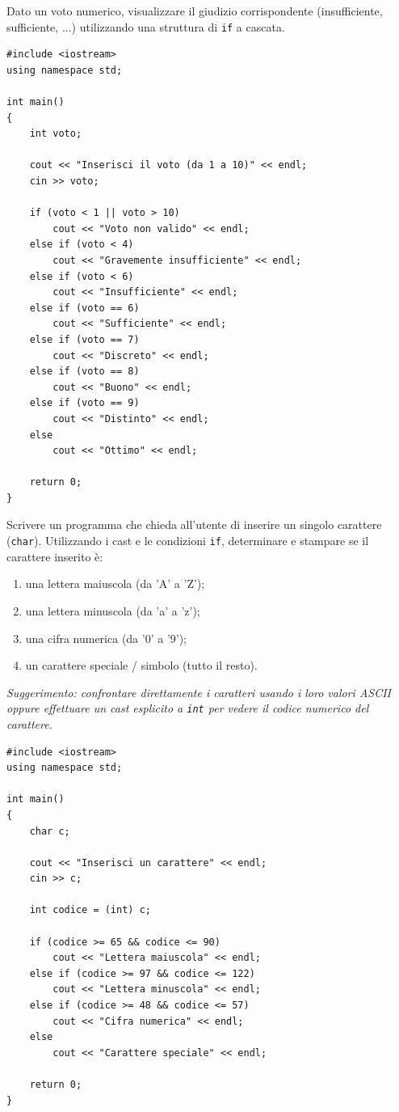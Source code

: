 \documentclass[11pt,fleqn]{book}
\begin{document}
\begin{esercizio}[1]
    Dato un voto numerico, visualizzare il giudizio corrispondente (insufficiente, sufficiente, ...) utilizzando una struttura di \texttt{if} a cascata.
    \ifsoluzioni
    \solution
    \begin{lstlisting}[style=cpp]
#include <iostream>
using namespace std;

int main()
{
    int voto;

    cout << "Inserisci il voto (da 1 a 10)" << endl;
    cin >> voto;

    if (voto < 1 || voto > 10)
        cout << "Voto non valido" << endl;
    else if (voto < 4)
        cout << "Gravemente insufficiente" << endl;
    else if (voto < 6)
        cout << "Insufficiente" << endl;
    else if (voto == 6)
        cout << "Sufficiente" << endl;
    else if (voto == 7)
        cout << "Discreto" << endl;
    else if (voto == 8)
        cout << "Buono" << endl;
    else if (voto == 9)
        cout << "Distinto" << endl;
    else
        cout << "Ottimo" << endl;

    return 0;
}
    \end{lstlisting}
    \fi
\end{esercizio}

\begin{esercizio}[2]
    Scrivere un programma che chieda all'utente di inserire un singolo carattere (\texttt{char}). Utilizzando i cast e le condizioni \texttt{if}, determinare e stampare se il carattere inserito è:
    \begin{enumerate}
        \item una lettera maiuscola (da 'A' a 'Z');
        \item una lettera minuscola (da 'a' a 'z');
        \item una cifra numerica (da '0' a '9');
        \item un carattere speciale / simbolo (tutto il resto).
    \end{enumerate}
    \textit{Suggerimento: confrontare direttamente i caratteri usando i loro valori ASCII oppure effettuare un cast esplicito a \texttt{int} per vedere il codice numerico del carattere.}
    \ifsoluzioni
    \solution
    \begin{lstlisting}[style=cpp]
#include <iostream>
using namespace std;

int main()
{
    char c;

    cout << "Inserisci un carattere" << endl;
    cin >> c;

    int codice = (int) c;

    if (codice >= 65 && codice <= 90)
        cout << "Lettera maiuscola" << endl;
    else if (codice >= 97 && codice <= 122)
        cout << "Lettera minuscola" << endl;
    else if (codice >= 48 && codice <= 57)
        cout << "Cifra numerica" << endl;
    else
        cout << "Carattere speciale" << endl;

    return 0;
}
    \end{lstlisting}
    \fi
\end{esercizio}
\end{document}
